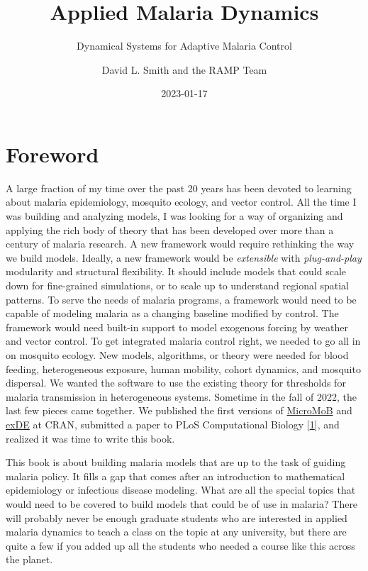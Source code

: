 \documentclass[
]{book}
\title{Applied Malaria Dynamics}
\subtitle{Dynamical Systems for Adaptive Malaria Control}
\author{David L. Smith and the RAMP Team}
\date{2023-01-17}
\begin{document}
\maketitle

{
\setcounter{tocdepth}{2}
\tableofcontents
}
\hypertarget{foreword}{%
\chapter*{Foreword}\label{foreword}}

A large fraction of my time over the past 20 years has been devoted to learning about malaria epidemiology, mosquito ecology, and vector control. All the time I was building and analyzing models, I was looking for a way of organizing and applying the rich body of theory that has been developed over more than a century of malaria research. A new framework would require rethinking the way we build models. Ideally, a new framework would be \emph{extensible} with \emph{plug-and-play} modularity and structural flexibility. It should include models that could scale down for fine-grained simulations, or to scale up to understand regional spatial patterns. To serve the needs of malaria programs, a framework would need to be capable of modeling malaria as a changing baseline modified by control. The framework would need built-in support to model exogenous forcing by weather and vector control. To get integrated malaria control right, we needed to go all in on mosquito ecology. New models, algorithms, or theory were needed for blood feeding, heterogeneous exposure, human mobility, cohort dynamics, and mosquito dispersal. We wanted the software to use the existing theory for thresholds for malaria transmission in heterogeneous systems. Sometime in the fall of 2022, the last few pieces came together. We published the first versions of \href{https://cran.r-project.org/package=MicroMoB}{MicroMoB}
and \href{https://CRAN.R-project.org/package=exDE}{exDE} at CRAN, submitted a paper to PLoS Computational Biology {[}\protect\hyperlink{ref-WuSL2022SpatialDynamics}{1}{]}, and realized it was time to write this book.

This book is about building malaria models that are up to the task of guiding malaria policy. It fills a gap that comes after an introduction to mathematical epidemiology or infectious disease modeling. What are all the special topics that would need to be covered to build models that could be of use in malaria? There will probably never be enough graduate students who are interested in applied malaria dynamics to teach a class on the topic at any university, but there are quite a few if you added up all the students who needed a course like this across the planet.
\end{document}

